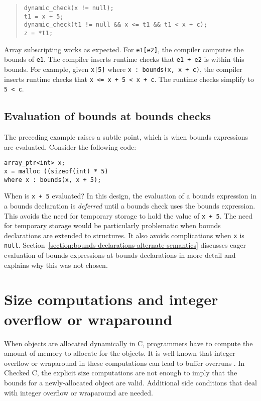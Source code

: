 \begin{quote}
\begin{verbatim}
dynamic_check(x != null);
t1 = x + 5;
dynamic_check(t1 != null && x <= t1 && t1 < x + c);
z = *t1;
\end{verbatim}
\end{quote}

Array subscripting works as expected. For \texttt{e1[e2]}, the
compiler computes the bounds of \texttt{e1}. The compiler inserts
runtime checks that \texttt{e1 + e2} is within this bounds. For example,
given \verb|x[5]| where \verb|x : bounds(x, x + c)|, the
compiler inserts runtime checks that \verb|x <= x + 5 < x + c|. 
The runtime checks simplify to \verb|5 < c|.

\subsection{Evaluation of bounds at bounds checks}

The preceding example raises a subtle point, which is when bounds
expressions are evaluated. Consider the following code:

\begin{verbatim}
array_ptr<int> x;
x = malloc ((sizeof(int) * 5)
where x : bounds(x, x + 5);
\end{verbatim}

When is \texttt{x + 5} evaluated?  In this design, 
the evaluation of a bounds expression in a bounds declaration is
{\em deferred} until a bounds check uses the bounds expression. 
This avoids the need for temporary storage to 
hold the value of \texttt{x + 5}.  The need for temporary storage would
be particularly problematic when bounds declarations are extended
to structures.   It also avoids complications when \texttt{x} is
\texttt{null}. Section~\ref{section:bounds-declarations-alternate-semantics} 
discusses eager evaluation of bounds expressions at
bounds declarations in more detail and explains why this was not chosen.

\section{Size computations and integer overflow or wraparound}
\label{section:integer-overflow-informal}

When objects are allocated dynamically in C, programmers have to compute
the amount of memory to allocate for the objects. It is well-known 
that integer overflow or wraparound in these computations can lead to buffer
overruns \cite{Howard2003,Mitre2015-128,Mitre2015-190,Mitre2015-680,Dietz2015}.
 In Checked C, the explicit size computations are not enough
to imply that the bounds for a newly-allocated object are valid.
Additional side conditions that deal with integer overflow or wraparound
are needed.

